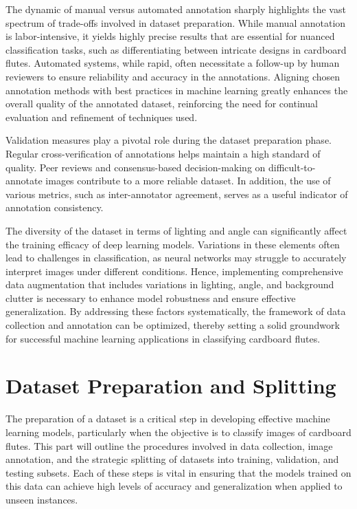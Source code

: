 The dynamic of manual versus automated annotation sharply highlights the vast spectrum of trade-offs involved in dataset preparation. While manual annotation is labor-intensive, it yields highly precise results that are essential for nuanced classification tasks, such as differentiating between intricate designs in cardboard flutes. Automated systems, while rapid, often necessitate a follow-up by human reviewers to ensure reliability and accuracy in the annotations. Aligning chosen annotation methods with best practices in machine learning greatly enhances the overall quality of the annotated dataset, reinforcing the need for continual evaluation and refinement of techniques used.



Validation measures play a pivotal role during the dataset preparation phase. Regular cross-verification of annotations helps maintain a high standard of quality. Peer reviews and consensus-based decision-making on difficult-to-annotate images contribute to a more reliable dataset. In addition, the use of various metrics, such as inter-annotator agreement, serves as a useful indicator of annotation consistency.



The diversity of the dataset in terms of lighting and angle can significantly affect the training efficacy of deep learning models. Variations in these elements often lead to challenges in classification, as neural networks may struggle to accurately interpret images under different conditions. Hence, implementing comprehensive data augmentation that includes variations in lighting, angle, and background clutter is necessary to enhance model robustness and ensure effective generalization. By addressing these factors systematically, the framework of data collection and annotation can be optimized, thereby setting a solid groundwork for successful machine learning applications in classifying cardboard flutes.

\section{Dataset Preparation and Splitting}

The preparation of a dataset is a critical step in developing effective machine learning models, particularly when the objective is to classify images of cardboard flutes. This part will outline the procedures involved in data collection, image annotation, and the strategic splitting of datasets into training, validation, and testing subsets. Each of these steps is vital in ensuring that the models trained on this data can achieve high levels of accuracy and generalization when applied to unseen instances.


